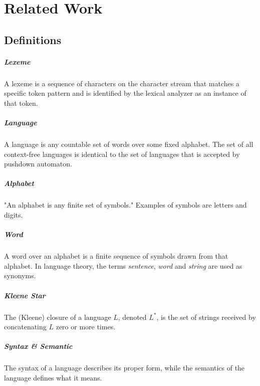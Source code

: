\chapter{Related Work}
\section{Definitions}

\paragraph{Lexeme}
A lexeme is a sequence of characters on the character stream that matches a specific token pattern and is identified by the lexical analyzer as an instance of that token. \cite{DragonBook}

\paragraph{Language} 
A language is any countable set of words over some fixed alphabet. The set of all context-free languages is identical to the set of languages that is accepted by pushdown automaton. \cite{DragonBook}

\paragraph{Alphabet}
"An alphabet is any finite set of symbols." Examples of symbols are letters and digits. \cite{DragonBook}

\paragraph{Word} 
A word over an alphabet is a finite sequence of symbols drawn from that alphabet. In language theory, the terms \emph{sentence}, \emph{word} and \emph{string} are used as synonyms. \cite{DragonBook}

\paragraph{Kleene Star} 
The (Kleene) closure of a language $L$, denoted $L^*$, is the set of strings received by concatenating $L$ zero or more times. \cite{DragonBook}


\paragraph{Syntax \& Semantic}  
The syntax of a language describes its proper form, while the semantics of the language defines what it means. \cite{DragonBook}


